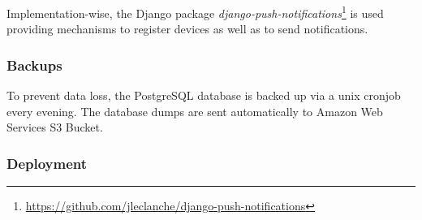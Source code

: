 Implementation-wise, the Django package \textit{django-push-notifications}\footnote{\url{https://github.com/jleclanche/django-push-notifications}} is used providing mechanisms to register devices as well as to send notifications.
\subsubsection{Backups}
To prevent data loss, the PostgreSQL database is backed up via a unix cronjob every evening. The database dumps are sent automatically to Amazon Web Services S3 Bucket.
\subsubsection{Deployment}

